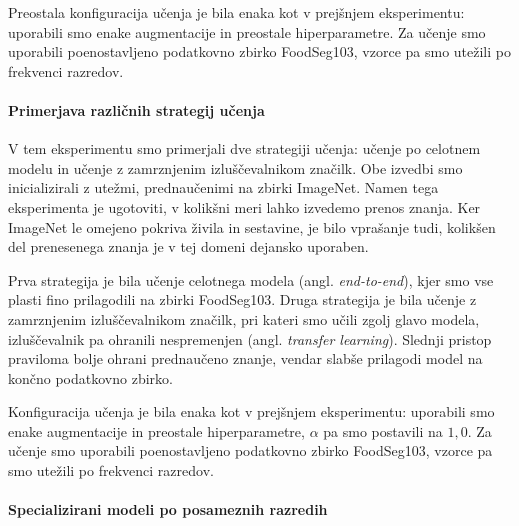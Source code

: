 \documentclass[a4paper,twoside,openright,12pt,slovene]{book}
\begin{document}
            Preostala konfiguracija učenja je bila enaka kot v prejšnjem
            eksperimentu: uporabili smo enake augmentacije in preostale
            hiperparametre. Za učenje smo uporabili poenostavljeno
            podatkovno zbirko FoodSeg103, vzorce pa smo utežili po frekvenci
            razredov.
            
            \paragraph{Primerjava različnih strategij učenja}


            V tem eksperimentu smo primerjali dve strategiji učenja: učenje po celotnem
            modelu in učenje z zamrznjenim izluščevalnikom značilk. Obe izvedbi
            smo inicializirali z utežmi, prednaučenimi na zbirki ImageNet. Namen tega
            eksperimenta je ugotoviti, v kolikšni meri lahko izvedemo prenos
            znanja. Ker ImageNet le omejeno pokriva živila in sestavine, je
            bilo vprašanje tudi, kolikšen del prenesenega znanja je v tej domeni
            dejansko uporaben.

            Prva strategija je bila učenje celotnega modela (angl. \emph{end-to-end}),
            kjer smo vse plasti fino prilagodili na zbirki FoodSeg103. Druga
            strategija je bila učenje z zamrznjenim izluščevalnikom značilk, pri
            kateri smo učili zgolj glavo modela, izluščevalnik pa ohranili
            nespremenjen (angl. \textit{transfer learning}). Slednji pristop
            praviloma bolje ohrani prednaučeno znanje, vendar slabše prilagodi
            model na končno podatkovno zbirko.
            
            Konfiguracija učenja je bila enaka kot v prejšnjem eksperimentu:
            uporabili smo enake augmentacije in preostale hiperparametre,
            $\alpha$ pa smo postavili na $1{,}0$. Za učenje smo uporabili
            poenostavljeno podatkovno zbirko FoodSeg103, vzorce pa smo utežili
            po frekvenci razredov.

            \paragraph{Specializirani modeli po posameznih razredih}
\end{document}
